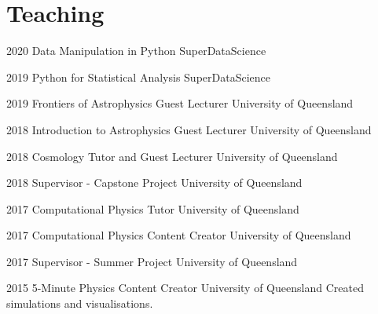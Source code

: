 \section{Teaching}
\begin{entrylist}
	\entryInlineSmall
	{2020}
	{Data Manipulation in Python}
	{SuperDataScience}
	{}
\end{entrylist}
\begin{entrylist}
    \entryInlineSmall
    {2019}
    {Python for Statistical Analysis}
    {SuperDataScience}
    {}
\end{entrylist}
\begin{entrylist}
	\entryInlineSmall
	{2019}
	{Frontiers of Astrophysics Guest Lecturer}
	{University of Queensland}
	{}
\end{entrylist}
\begin{entrylist}
	\entryInlineSmall
	{2018}
	{Introduction to Astrophysics Guest Lecturer}
	{University of Queensland}
	{}
\end{entrylist}
\begin{entrylist}
	\entryInlineSmall
	{2018}
	{Cosmology Tutor and Guest Lecturer}
	{University of Queensland}
	{}
\end{entrylist}
\begin{entrylist}
	\entryInlineSmall
	{2018}
	{Supervisor - Capstone Project}
	{University of Queensland}
	{}
\end{entrylist}
\begin{entrylist}
	\entryInlineSmall
	{2017}
	{Computational Physics Tutor}
	{University of Queensland}
	{}
\end{entrylist}
\begin{entrylist}
	\entryInlineSmall
	{2017}
	{Computational Physics Content Creator}
	{University of Queensland}
	{}
\end{entrylist}
\begin{entrylist}
	\entryInlineSmall
	{2017}
	{Supervisor - Summer Project}
	{University of Queensland}
	{}
\end{entrylist}
\begin{entrylist}
	\entryInlineSmall
	{2015}
	{5-Minute Physics Content Creator}
	{University of Queensland}
	{Created simulations and visualisations.}
\end{entrylist}





